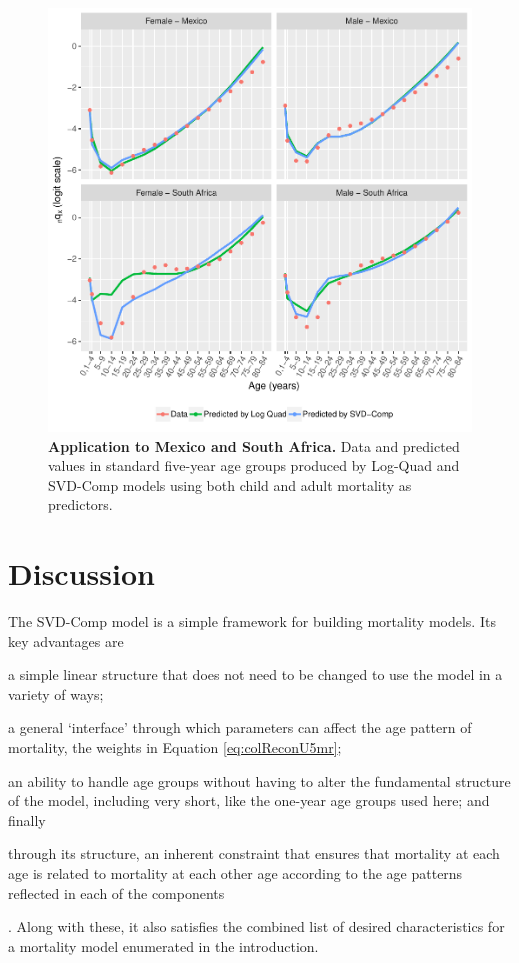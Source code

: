 \documentclass[11pt]{article}
\begin{document}
\begin{figure}[htbp]
   \centering
   \includegraphics[width=\linewidth]{../figures/fig7.pdf} 
   \captionsetup{format=plain,font=normalsize,margin=0cm,justification=justified}
   \caption{\textbf{Application to Mexico and South Africa.} Data and predicted values in standard five-year age groups produced by Log-Quad and SVD-Comp models using both child and adult mortality as predictors.}
   \label{fig:mexRSA}
\end{figure}


\section{Discussion}

The SVD-Comp model is a simple framework for building mortality models.  Its key advantages are
\begin{enumerate*}[label=\arabic*)]
\item a simple linear structure that does not need to be changed to use the model in a variety of ways;
\item a general `interface' through which  parameters can affect the age pattern of mortality, the weights in Equation \ref{eq:colReconU5mr}; 
\item an ability to handle  age groups without having to alter the fundamental structure of the model, including very short, like the one-year age groups used here; and finally
\item through its structure, an inherent constraint that ensures that mortality at each age is related to mortality at each other age according to the age patterns reflected in each of the components
\end{enumerate*}.  Along with these, it also satisfies the combined list of desired characteristics for a mortality model enumerated in the introduction.  
\end{document}
